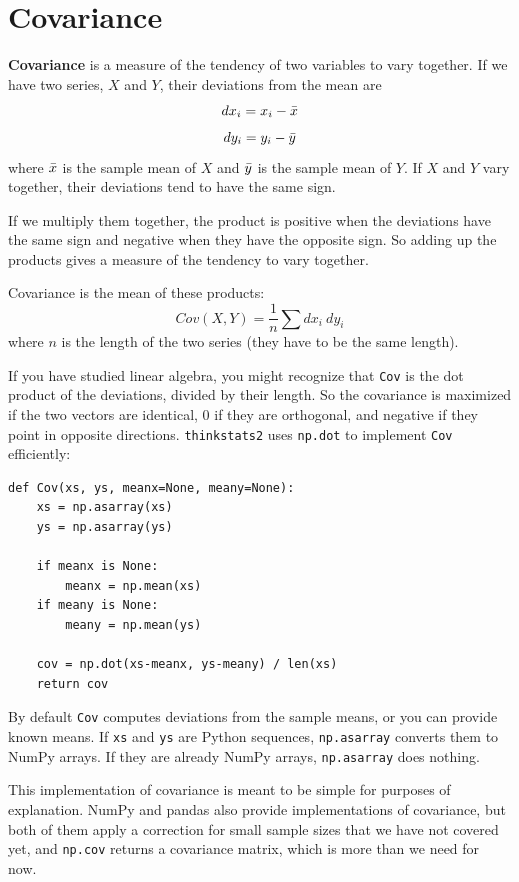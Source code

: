 \documentclass[12pt]{book}
\begin{document}
\section{Covariance}

{\bf Covariance} is a measure of the tendency of two variables
to vary together.  If we have two series, $X$ and $Y$, their
deviations from the mean are
%
\[ dx_i = x_i - \bar{x} \]
\[ dy_i = y_i - \bar{y} \]
%
where $\bar{x}$ is the sample mean of $X$ and $\bar{y}$ is the sample mean
of $Y$.  If $X$ and $Y$ vary together, their deviations tend to have
the same sign.

If we multiply them together, the product is positive when the
deviations have the same sign and negative when they have the opposite
sign.  So adding up the products gives a measure of the tendency to
vary together.

Covariance is the mean of these products:
%
\[ Cov(X,Y) = \frac{1}{n} \sum dx_i~dy_i \]
%
where $n$ is the length of the two series (they have to be the same
length).

If you have studied linear algebra, you might recognize that
{\tt Cov} is the dot product of the deviations, divided
by their length.  So the covariance is maximized if the two vectors
are identical, 0 if they are orthogonal, and negative if they
point in opposite directions.  {\tt thinkstats2} uses {\tt np.dot} to
implement {\tt Cov} efficiently:

\begin{verbatim}
def Cov(xs, ys, meanx=None, meany=None):
    xs = np.asarray(xs)
    ys = np.asarray(ys)

    if meanx is None:
        meanx = np.mean(xs)
    if meany is None:
        meany = np.mean(ys)

    cov = np.dot(xs-meanx, ys-meany) / len(xs)
    return cov
\end{verbatim}

By default {\tt Cov} computes deviations from the sample means,
or you can provide known means.  If {\tt xs} and {\tt ys} are
Python sequences, {\tt np.asarray} converts them to NumPy arrays.
If they are already NumPy arrays, {\tt np.asarray} does nothing.

This implementation of covariance is meant to be simple for purposes
of explanation.  NumPy and pandas also provide implementations of
covariance, but both of them apply a correction for small sample sizes
that we have not covered yet, and {\tt np.cov} returns a covariance
matrix, which is more than we need for now.
\end{document}

